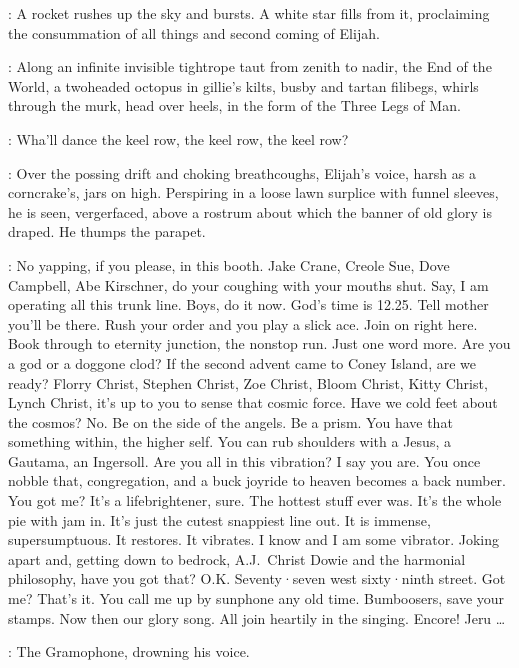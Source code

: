 :
A rocket rushes up the sky and bursts.
A white star fills from it,
proclaiming the consummation of all things and second coming of Elijah.

:
Along an infinite invisible tightrope taut from zenith to nadir,
the End of the World,
a twoheaded octopus in gillie's kilts,
busby and tartan filibegs,
whirls through the murk,
head over heels,
in the form of the Three Legs of Man.

\EndOfWorld:
Wha'll dance the keel row,
the keel row,
the keel row?

:
Over the possing drift and choking breathcoughs,
Elijah's voice,
harsh as a corncrake's,
jars on high.
Perspiring in a loose lawn surplice with funnel sleeves,
he is seen,
vergerfaced,
above a rostrum about which the banner of old glory is draped.
He thumps the parapet.

\Elijah:
No yapping,
if you please,
in this booth.
Jake Crane,
Creole Sue,
Dove Campbell,
Abe Kirschner,
do your coughing with your mouths shut.
Say,
I am operating all this trunk line.
Boys,
do it now.
God's time is 12.25.
Tell mother you'll be there.
Rush your order and you play a slick ace.
Join on right here.
Book through to eternity junction,
the nonstop run.
Just one word more.
Are you a god or a doggone clod?
If the second advent came to Coney Island,
are we ready?
Florry Christ,
Stephen Christ,
Zoe Christ,
Bloom Christ,
Kitty Christ,
Lynch Christ,
it's up to you to sense that cosmic force.
Have we cold feet about the cosmos?
No.
Be on the side of the angels.
Be a prism.
You have that something within,
the higher self.
You can rub shoulders with a Jesus,
a Gautama,
an Ingersoll.
Are you all in this vibration?
I say you are.
You once nobble that,
congregation,
and a buck joyride to heaven becomes a back number.
You got me?
It's a lifebrightener,
sure.
The hottest stuff ever was.
It's the whole pie with jam in.
It's just the cutest snappiest line out.
It is immense,
supersumptuous.
It restores.
It vibrates.
I know and I am some vibrator.
Joking apart and,
getting down to bedrock,
A.J.~Christ Dowie
and the harmonial philosophy,
have you got that?
O.K.
Seventy·seven west sixty·ninth street.
Got me?
That's it.
You call me up by sunphone any old time.
Bumboosers,
save your stamps.
Now then our glory song.
All join heartily in the singing.
Encore!
Jeru \ldots

:
The Gramophone,
drowning his voice.

